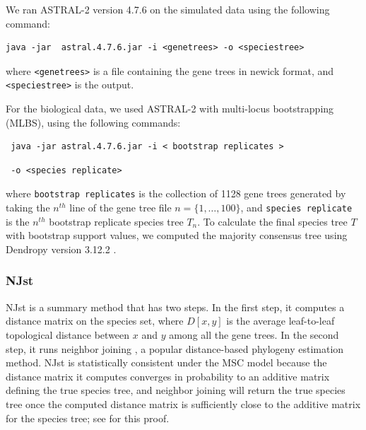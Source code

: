 
We ran ASTRAL-2 version 4.7.6 on the simulated data using the
following  command:
\begin{verbatim}
java -jar  astral.4.7.6.jar -i <genetrees> -o <speciestree>
\end{verbatim} 
\noindent
where {\tt <genetrees>}  is a file containing 
the gene trees in newick format, and 
{\tt <speciestree>} is the output.




For  the biological data, we used ASTRAL-2 with 
multi-locus bootstrapping (MLBS), using the following commands:
\begin{verbatim}
 java -jar astral.4.7.6.jar -i < bootstrap replicates >  \end{verbatim}
 \begin{verbatim} -o <species replicate> \end{verbatim}
where 
{\tt bootstrap replicates}
is the collection of 1128 gene trees generated by taking the $n^{th}$ line of the gene tree file $n = \{1, \ldots , 100\}$, and
{\tt species replicate}
is the $n^{th}$ bootstrap replicate species tree $T_{n}$.  To calculate the final species tree $T$ with bootstrap support values, we computed the majority consensus tree using Dendropy version 3.12.2  \cite{Dendropy}.  

\subsubsection{NJst}
NJst is a summary method that 
has two steps. In the first step, it computes a distance matrix on
the species set, where $D[x,y]$ is the average
leaf-to-leaf topological distance between $x$ and $y$ among all the
gene trees. In the second step, it runs neighbor joining \cite{NJ}, a popular
distance-based phylogeny estimation method. 
NJst is statistically consistent under the 
MSC model
because the distance matrix it computes converges in
probability to an additive matrix defining the true
species tree, and neighbor joining will return
the true species tree once the computed distance matrix  is
sufficiently close to the additive matrix for the species tree; see
\cite{njst} for this proof.

